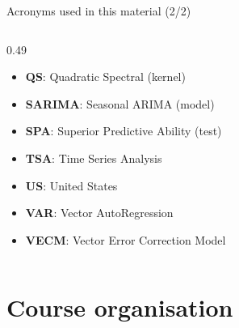 \begin{frame}{Acronyms used in this material (2/2)}
\begin{columns}[T]
\begin{column}{0.49\textwidth}
\begin{itemize}
    \item \textbf{QS}: Quadratic Spectral (kernel)
    \item \textbf{SARIMA}: Seasonal ARIMA (model)
    \item \textbf{SPA}: Superior Predictive Ability (test)
    \item \textbf{TSA}: Time Series Analysis
    \item \textbf{US}: United States
    \item \textbf{VAR}: Vector AutoRegression
    \item \textbf{VECM}: Vector Error Correction Model
\end{itemize}
\end{column}
\end{columns}
\end{frame}

\section{Course organisation}

